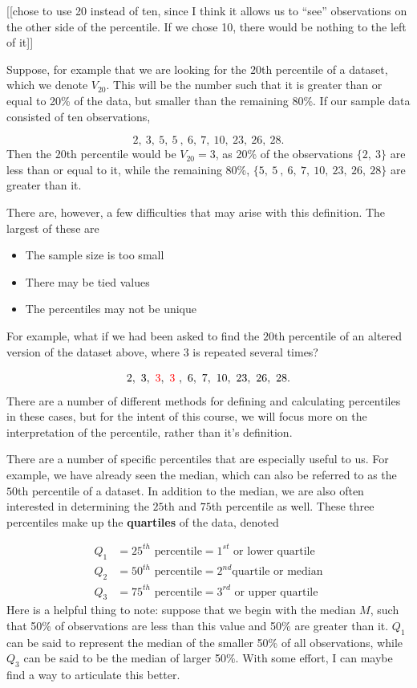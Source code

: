 \documentclass[
]{book}
\providecommand{\tightlist}{%
  \setlength{\itemsep}{0pt}\setlength{\parskip}{0pt}}
\theoremstyle{definition}
\theoremstyle{definition}
\theoremstyle{definition}
\theoremstyle{remark}
\begin{document}
{[}{[}chose to use 20 instead of ten, since I think it allows us to ``see'' observations on the other side of the percentile. If we chose 10, there would be nothing to the left of it{]}{]}

Suppose, for example that we are looking for the \(20\)th percentile of a dataset, which we denote \(V_{20}\). This will be the number such that it is greater than or equal to 20\% of the data, but smaller than the remaining 80\%. If our sample data consisted of ten observations,

\[
2,\ 3,\ 5,\ 5\ ,\ 6 ,\ 7,\ 10,\ 23,\ 26,\ 28.
\]
Then the \(20\)th percentile would be \(V_{20} = 3\), as 20\% of the observations \(\{2, \ 3\}\) are less than or equal to it, while the remaining 80\%, \(\{5,\ 5\ ,\ 6 ,\ 7,\ 10,\ 23,\ 26,\ 28 \}\) are greater than it.

There are, however, a few difficulties that may arise with this definition. The largest of these are

\begin{itemize}
\tightlist
\item
  The sample size is too small
\item
  There may be tied values
\item
  The percentiles may not be unique
\end{itemize}

For example, what if we had been asked to find the \(20\)th percentile of an altered version of the dataset above, where 3 is repeated several times?

\[
2,\ 3,\ {\color{red} 3},\ {\color{red} 3}\ ,\ 6 ,\ 7,\ 10,\ 23,\ 26,\ 28.
\]
There are a number of different methods for defining and calculating percentiles in these cases, but for the intent of this course, we will focus more on the interpretation of the percentile, rather than it's definition.

There are a number of specific percentiles that are especially useful to us. For example, we have already seen the median, which can also be referred to as the \(50\)th percentile of a dataset. In addition to the median, we are also often interested in determining the \(25\)th and \(75\)th percentile as well. These three percentiles make up the \textbf{quartiles} of the data, denoted

\[
\begin{align*}
Q_1 &= 25^{th} \text{ percentile} = 1^{st} \text{ or lower quartile} \\
Q_2 &= 50^{th} \text{ percentile} = 2^{nd} \text{quartile or median} \\
Q_3 &= 75^{th} \text{ percentile} = 3^{rd} \text{ or upper quartile}
\end{align*}
\]
Here is a helpful thing to note: suppose that we begin with the median \(M\), such that 50\% of observations are less than this value and 50\% are greater than it. \(Q_1\) can be said to represent the median of the smaller 50\% of all observations, while \(Q_3\) can be said to be the median of larger 50\%. With some effort, I can maybe find a way to articulate this better.
\end{document}

